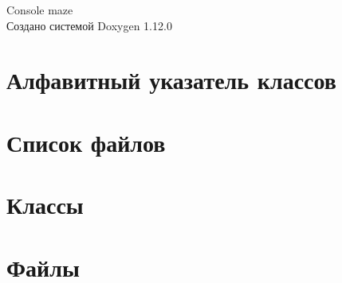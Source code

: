 \documentclass[twoside]{book}
\newcommand{\+}{\discretionary{\mbox{\scriptsize$\hookleftarrow$}}{}{}}
\newcommand{\clearemptydoublepage}{%
    \newpage{\pagestyle{empty}\cleardoublepage}%
  }
\begin{document}
  \raggedbottom
    \hypersetup{pageanchor=false,
                bookmarksnumbered=true,
                pdfencoding=unicode
               }
  \begin{titlepage}
  \vspace*{7cm}
  \begin{center}%
  {\Large Console maze}\\
  \vspace*{1cm}
  {\large Создано системой Doxygen 1.12.0}\\
  \end{center}
  \end{titlepage}
  \clearemptydoublepage
  \tableofcontents
  \clearemptydoublepage
  \hypersetup{pageanchor=true}
\chapter{Алфавитный указатель классов}

\chapter{Список файлов}

\chapter{Классы}




\chapter{Файлы}











  \backmatter
  \newpage
  \clearemptydoublepage
  \printindex
\end{document}
